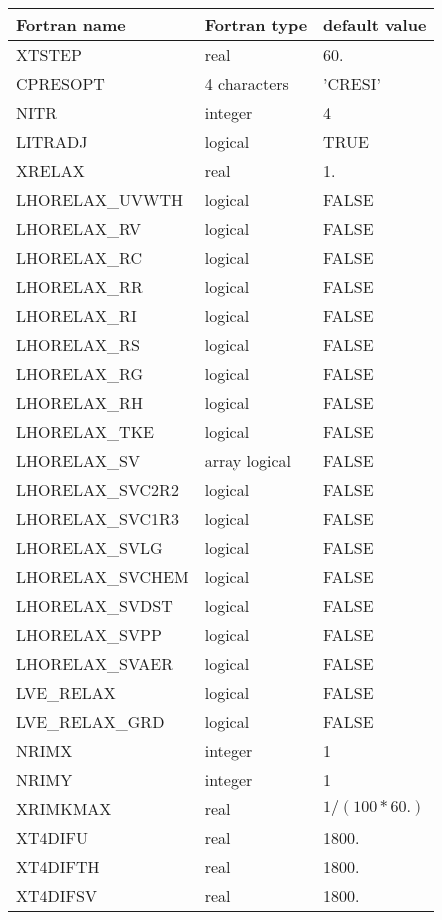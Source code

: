 \begin{center}
\begin{tabular} {|l|l|l|}
\hline
Fortran name & Fortran type & default value \\
\hline
XTSTEP    & real   & 60.  \\
CPRESOPT  & 4 characters  & 'CRESI'  \\
NITR      & integer   & 4   \\
LITRADJ   & logical   & TRUE  \\
XRELAX    & real     & 1.   \\
LHORELAX\_UVWTH &  logical  & FALSE  \\
LHORELAX\_RV &  logical  & FALSE  \\
LHORELAX\_RC &  logical  & FALSE  \\
LHORELAX\_RR &  logical  & FALSE  \\
LHORELAX\_RI &  logical  & FALSE  \\
LHORELAX\_RS &  logical  & FALSE  \\
LHORELAX\_RG &  logical  & FALSE  \\
LHORELAX\_RH &  logical  & FALSE  \\
LHORELAX\_TKE &  logical  & FALSE  \\
LHORELAX\_SV & array logical & FALSE  \\
LHORELAX\_SVC2R2 &   logical & FALSE  \\
LHORELAX\_SVC1R3 &   logical & FALSE  \\
LHORELAX\_SVLG   &   logical & FALSE  \\
LHORELAX\_SVCHEM &   logical & FALSE  \\
LHORELAX\_SVDST  &   logical & FALSE  \\
LHORELAX\_SVPP   &   logical & FALSE  \\
LHORELAX\_SVAER  &   logical & FALSE  \\
LVE\_RELAX&  logical  & FALSE  \\
LVE\_RELAX\_GRD&  logical  & FALSE  \\
NRIMX     & integer   & 1   \\
NRIMY     & integer   & 1   \\
XRIMKMAX  &  real     & $1 / (100*60.) $ \\
XT4DIFU   &  real     & 1800.  \\
XT4DIFTH  &  real     & 1800.  \\
XT4DIFSV  &  real     & 1800.  \\
\hline
\end{tabular}
\end{center}


